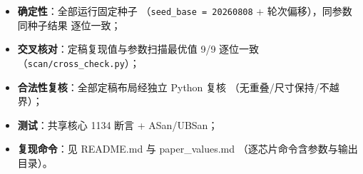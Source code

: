 \documentclass[12pt,a4paper]{article}
\begin{document}
\begin{itemize}
    \item \textbf{确定性}：全部运行固定种子
    （\texttt{seed\_base = 20260808} + 轮次偏移），同参数同种子结果
    逐位一致；
    \item \textbf{交叉核对}：定稿复现值与参数扫描最优值 9/9 逐位一致
    （\texttt{scan/cross\_check.py}）；
    \item \textbf{合法性复核}：全部定稿布局经独立 Python 复核
    （无重叠/尺寸保持/不越界）；
    \item \textbf{测试}：共享核心 1134 断言 + ASan/UBSan；
    \item \textbf{复现命令}：见 README.md 与 paper\_values.md
    （逐芯片命令含参数与输出目录）。
\end{itemize}
\end{document}
